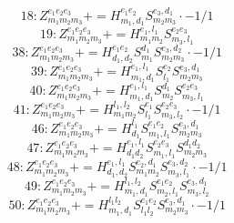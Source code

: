 \documentclass[letterpaper,10pt,fleqn,leqno,onecolumn]{article}
\begin{document}
\begin{equation} \;\;\;\;\;\;  18: Z^{e_{1}e_{2}e_{3}}_{m_{1}m_{2}m_{3}}+=H^{e_{1}e_{2}}_{m_{1},d_{1}}S^{e_{3},d_{1}}_{m_{2}m_{3}}\cdot -1/1 \end{equation}
\begin{equation} \;\;\;\;\;\;  19: Z^{e_{1}e_{2}e_{3}}_{m_{1}m_{2}m_{3}}+=H^{e_{1},l_{1}}_{m_{1}m_{2}}S^{e_{2}e_{3}}_{m_{3},l_{1}} \end{equation}
\begin{equation} \;\;\;\;\;\;  38: Z^{e_{1}e_{2}e_{3}}_{m_{1}m_{2}m_{3}}+=H^{e_{1}e_{2}}_{d_{1},d_{2}}S^{d_{1}}_{m_{1}}S^{e_{3},d_{2}}_{m_{2}m_{3}}\cdot -1/1 \end{equation}
\begin{equation} \;\;\;\;\;\;  39: Z^{e_{1}e_{2}e_{3}}_{m_{1}m_{2}m_{3}}+=H^{e_{1},l_{1}}_{m_{1},d_{1}}S^{e_{2}}_{l_{1}}S^{e_{3},d_{1}}_{m_{2}m_{3}} \end{equation}
\begin{equation} \;\;\;\;\;\;  40: Z^{e_{1}e_{2}e_{3}}_{m_{1}m_{2}m_{3}}+=H^{e_{1},l_{1}}_{m_{1},d_{1}}S^{d_{1}}_{m_{2}}S^{e_{2}e_{3}}_{m_{3},l_{1}} \end{equation}
\begin{equation} \;\;\;\;\;\;  41: Z^{e_{1}e_{2}e_{3}}_{m_{1}m_{2}m_{3}}+=H^{l_{1},l_{2}}_{m_{1}m_{2}}S^{e_{1}}_{l_{1}}S^{e_{2}e_{3}}_{m_{3},l_{2}}\cdot -1/1 \end{equation}
\begin{equation} \;\;\;\;\;\;  46: Z^{e_{1}e_{2}e_{3}}_{m_{1}m_{2}m_{3}}+=H^{l_{1}}_{d_{1}}S^{e_{1}e_{2}}_{m_{1},l_{1}}S^{e_{3},d_{1}}_{m_{2}m_{3}} \end{equation}
\begin{equation} \;\;\;\;\;\;  47: Z^{e_{1}e_{2}e_{3}}_{m_{1}m_{2}m_{3}}+=H^{e_{1},l_{1}}_{d_{1}d_{2}}S^{e_{2}e_{3}}_{m_{1},l_{1}}S^{d_{1}d_{2}}_{m_{2}m_{3}} \end{equation}
\begin{equation} \;\;\;\;\;\;  48: Z^{e_{1}e_{2}e_{3}}_{m_{1}m_{2}m_{3}}+=H^{e_{1},l_{1}}_{d_{1},d_{2}}S^{e_{2},d_{1}}_{m_{1}m_{2}}S^{e_{3},d_{2}}_{m_{3},l_{1}}\cdot -1/1 \end{equation}
\begin{equation} \;\;\;\;\;\;  49: Z^{e_{1}e_{2}e_{3}}_{m_{1}m_{2}m_{3}}+=H^{l_{1},l_{2}}_{m_{1},d_{1}}S^{e_{1}e_{2}}_{m_{2},l_{1}}S^{e_{3},d_{1}}_{m_{3},l_{2}} \end{equation}
\begin{equation} \;\;\;\;\;\;  50: Z^{e_{1}e_{2}e_{3}}_{m_{1}m_{2}m_{3}}+=H^{l_{1}l_{2}}_{m_{1},d_{1}}S^{e_{1}e_{2}}_{l_{1}l_{2}}S^{e_{3},d_{1}}_{m_{2}m_{3}}\cdot -1/1 \end{equation}
\end{document}
